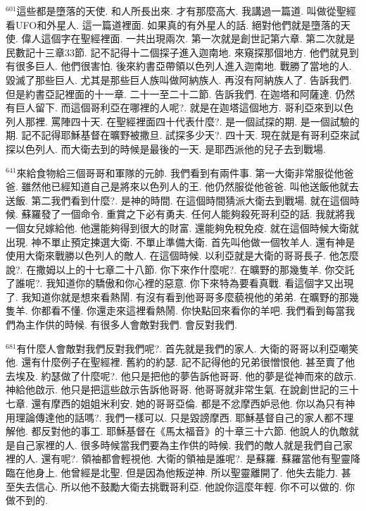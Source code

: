 \documentclass{book}
\begin{document}
$^{601}$這些都是墮落的天使.
和人所長出來.
才有那麼高大.
我講過一篇道.
叫做從聖經看UFO和外星人.
這一篇道裡面.
如果真的有外星人的話.
絕對他們就是墮落的天使.
偉人這個字在聖經裡面.
一共出現兩次.
第一次就是創世記第六章.
第二次就是民數記十三章33節.
記不記得十二個探子進入迦南地.
來窺探那個地方.
他們就見到有很多巨人.
他們很害怕.
後來約書亞帶領以色列人進入迦南地.
戰勝了當地的人.
毀滅了那些巨人.
尤其是那些巨人族叫做阿納族人.
再沒有阿納族人了.
告訴我們.
但是約書亞記裡面的十一章.
二十一至二十二節.
告訴我們.
在迦塔和阿薩達.
仍然有巨人留下.
而這個哥利亞在哪裡的人呢?.
就是在迦塔這個地方.
哥利亞來到以色列人那裡.
罵陣四十天.
在聖經裡面四十代表什麼?.
是一個試探的期.
是一個試驗的期.
記不記得耶穌基督在曠野被撒旦.
試探多少天?.
四十天.
現在就是有哥利亞來試探以色列人.
而大衛去到的時候是最後的一天.
是耶西派他的兒子去到戰場.

$^{641}$來給食物給三個哥哥和軍隊的元帥.
我們看到有兩件事.
第一大衛非常服從他爸爸.
雖然他已經知道自己是將來以色列人的王.
他仍然服從他爸爸.
叫他送飯他就去送飯.
第二我們看到什麼?.
是神的時間.
在這個時間猜派大衛去到戰場.
就在這個時候.
蘇羅發了一個命令.
重賞之下必有勇夫.
任何人能夠殺死哥利亞的話.
我就將我一個女兒嫁給他.
他還能夠得到很大的財富.
還能夠免稅免疫.
就在這個時候大衛就出現.
神不單止預定揀選大衛.
不單止準備大衛.
首先叫他做一個牧羊人.
還有神是使用大衛來戰勝以色列人的敵人.
在這個時候.
以利亞就是大衛的哥哥長子.
他怎麼說?.
在撒姆以上的十七章二十八節.
你下來作什麼呢?.
在曠野的那幾隻羊.
你交託了誰呢?.
我知道你的驕傲和你心裡的惡意.
你下來特為要看真戰.
看這個字又出現了.
我知道你就是想來看熱鬧.
有沒有看到他哥哥多麼藐視他的弟弟.
在曠野的那幾隻羊.
你都看不懂.
你還走來這裡看熱鬧.
你快點回來看你的羊吧.
我們看到每當我們為主作供的時候.
有很多人會敵對我們.
會反對我們.

$^{681}$有什麼人會敵對我們反對我們呢?.
首先就是我們的家人.
大衛的哥哥以利亞嘲笑他.
還有什麼例子在聖經裡.
舊約的約瑟.
記不記得他的兄弟很憎恨他.
甚至賣了他去埃及.
約瑟做了什麼呢?.
他只是把他的夢告訴他哥哥.
他的夢是從神而來的啟示.
神給他啟示.
他只是把這些啟示告訴他哥哥.
他哥哥就非常生氣.
在說創世記的三十七章.
還有摩西的姐姐米利安.
她的哥哥亞倫.
都是不忿摩西妒忌他.
你以為只有神用理論傳達他的話嗎?.
我們一樣可以.
只是毀謗摩西.
耶穌基督自己的家人都不理解他.
都反對他的事工.
耶穌基督在《馬太福音》的十章三十六節.
他說人的仇敵就是自己家裡的人.
很多時候當我們要為主作供的時候.
我們的敵人就是我們自己家裡的人.
還有呢?.
領袖都會輕視他.
大衛的領袖是誰呢?.
是蘇羅.
蘇羅當他有聖靈降臨在他身上.
他曾經是北聖.
但是因為他叛逆神.
所以聖靈離開了.
他失去能力.
甚至失去信心.
所以他不鼓勵大衛去挑戰哥利亞.
他說你這麼年輕.
你不可以做的.
你做不到的.
\end{document}
